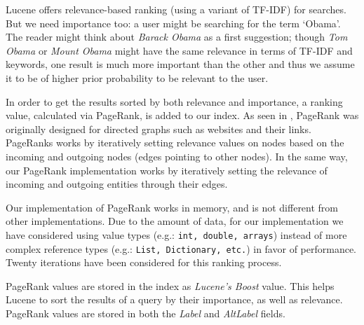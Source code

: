 Lucene offers relevance-based ranking (using a variant of TF-IDF) for searches. But we need importance too: a user might be searching for the term `Obama'. The reader might think about \textit{Barack Obama} as a first suggestion; though \textit{Tom Obama} or \textit{Mount Obama} might have the same relevance in terms of TF-IDF and keywords, one result is much more important than the other and thus we assume it to be of higher prior probability to be relevant to the user.

In order to get the results sorted by both relevance and importance, a ranking value, calculated via PageRank, is added to our index. 
As seen in , PageRank was originally designed for directed graphs such as websites and their links. 
PageRanks works by iteratively setting relevance values on nodes based on the incoming and outgoing nodes (edges pointing to other nodes). 
In the same way, our PageRank implementation works by iteratively setting the relevance of incoming and outgoing entities through their edges. 

Our implementation of PageRank works in memory, and is not different from other implementations. 
Due to the amount of data, for our implementation we have considered using value types (e.g.: \texttt{int, double, arrays}) instead of more complex reference types (e.g.: \texttt{List, Dictionary, etc.}) in favor of performance. 
Twenty iterations have been considered for this ranking process.

PageRank values are stored in the index as \textit{Lucene's Boost} value. This helps Lucene to sort the results of a query by their importance, as well as relevance. PageRank values are stored in both the \textit{Label} and \textit{AltLabel} fields.


